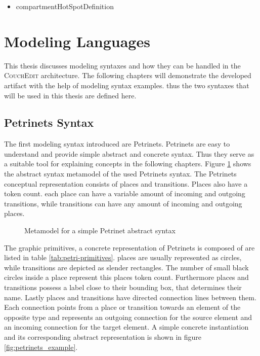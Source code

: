 \begin{itemize}
  \item compartmentHotSpotDefinition
\end{itemize}

\section{Modeling Languages}
\label{sec:modeling-languages}
This thesis discusses modeling syntaxes and how they can be handled in the \textsc{CouchEdit} architecture. The following chapters will demonstrate the developed artifact with the help of modeling syntax examples. thus the two syntaxes that will be used in this thesis are defined here.

\subsection{Petrinets Syntax}
\label{sec:petrinets}
The first modeling syntax introduced are Petrinets. Petrinets are easy to understand and provide simple abstract and concrete syntax. Thus they serve as a suitable tool for explaining concepts in the following chapters. Figure \ref{fig:petrinets_metamodel} shows the abstract syntax metamodel of the used Petrinets syntax. The Petrinets conceptual representation consists of places and transitions. Places also have a token count. each place can have a variable amount of incoming and outgoing transitions, while transitions can have any amount of incoming and outgoing places. 

\begin{figure}[H]
  \centering
  
  \caption{Metamodel for a simple Petrinet abstract syntax}
  \label{fig:petrinets_metamodel}
\end{figure}

The graphic primitives, a concrete representation of Petrinets is composed of are listed in table \ref{tab:petri-primitives}. places are usually represented as circles, while transitions are depicted as slender rectangles. The number of small black circles inside a place represent this places token count. Furthermore places and transitions possess a label close to their bounding box, that determines their name. Lastly places and transitions have directed connection lines between them. Each connection points from a place or transition towards an element of the opposite type and represents an outgoing connection for the source element and an incoming connection for the target element. A simple concrete instantiation and its corresponding abstract representation is shown in figure \ref{fig:petrinets_example}.

